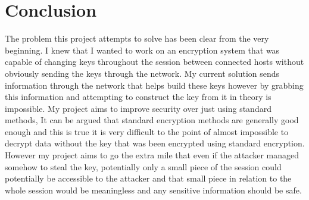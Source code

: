 \section{Conclusion}


The problem this project attempts to solve has been clear from the very beginning. I knew that I wanted to work on an encryption system that was capable of changing keys throughout the session between connected hosts without obviously sending the keys through the network. My current solution sends information through the network that helps build these keys however by grabbing this information and attempting to construct the key from it in theory is impossible. My project aims to improve security over just using standard methods, It can be argued that standard encryption methods are generally good enough and this is true it is very difficult to the point of almost impossible to decrypt data without the key that was been encrypted using standard encryption. However my project aims to go the extra mile that even if the attacker managed somehow to steal the key, potentially only a small piece of the session could potentially be accessible to the attacker and that small piece in relation to the whole session would be meaningless and any sensitive information should be safe.

